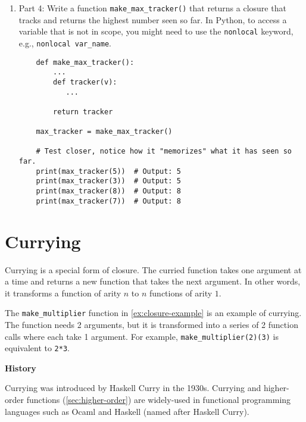 \documentclass[oneside,11pt,dvipsnames]{book}
\newenvironment{historybox}[1][]{
  \small
  \begin{myhistorybox}
    {\small \textbf{#1}}
  }{
  \end{myhistorybox}
}
\newcommand{\code}[1]{\texttt{#1}}
\begin{document}
\begin{enumerate}
\item Part 4: Write a function \code{make\_max\_tracker()} that returns a closure that tracks and returns the highest number seen so far. In Python, to access a variable that is not in scope, you might need to use the \code{nonlocal} keyword, e.g., \code{nonlocal var\_name}.
\begin{lstlisting}
    def make_max_tracker():
        ...
        def tracker(v):
           ...
        
        return tracker

    max_tracker = make_max_tracker()

    # Test closer, notice how it "memorizes" what it has seen so far.
    print(max_tracker(5))  # Output: 5
    print(max_tracker(3))  # Output: 5
    print(max_tracker(8))  # Output: 8
    print(max_tracker(7))  # Output: 8
\end{lstlisting} 

\end{enumerate}







\section{Currying}\label{sec:curry}

Currying is a special form of closure. The curried function takes one argument at a time and returns a new function that takes the next argument. In other words, it transforms a function of arity $n$ to $n$ functions of arity $1$.

The \code{make\_multiplier} function in \autoref{ex:closure-example} is an example of currying. The function needs 2 arguments, but it is transformed into a series of 2 function calls where each take 1 argument. For example, \code{make\_multiplier(2)(3)} is equivalent to \code{2*3}.


\begin{historybox}[History] 
    Currying was introduced by Haskell Curry in the 1930s. Currying and higher-order functions (\autoref{sec:higher-order}) are widely-used in functional programming languages such as Ocaml and Haskell (named after Haskell Curry).
\end{historybox}
\end{document}
